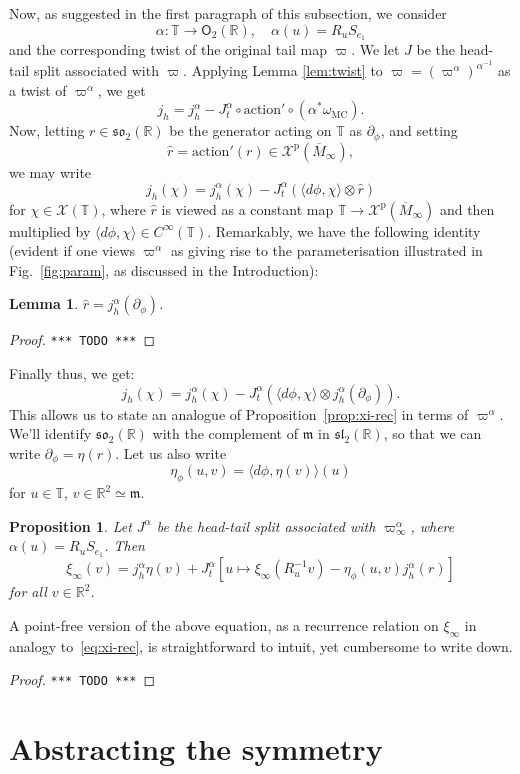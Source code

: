 \documentclass{article}
\def\MISS{\texttt{*** TODO ***}}
\def\fsl{\mathfrak{sl}}
\def\fso{\mathfrak{so}}
\def\fm{\mathfrak{m}}
\def\RR{\mathbb{R}}
\def\TT{\mathbb{T}}
\def\XX{\mathcal{X}}
\def\O{\mathsf{O}}
\def\p{\mathrm{p}}
\newtheorem{lem}{Lemma}
\newtheorem{prop}{Proposition}
\theoremstyle{definition}
\begin{document}
Now, as suggested in the first paragraph of this subsection,
we consider
$$ \alpha : \TT \to \O_2(\RR),\quad \alpha(u) = R_u S_{e_1} $$
and the corresponding twist of the original tail map
$\varpi$. We let $J$ be the head-tail split
associated with $\varpi$. Applying Lemma \ref{lem:twist}
to $\varpi=(\varpi^\alpha)^{\alpha^{-1}}$ as a twist of $\varpi^\alpha$,
we get
$$
 j_h = j^\alpha_h - J^\alpha_t \circ \mathrm{action}' \circ (\alpha^*\omega_{\mathrm{MC}}).
$$
Now, letting $r \in \fso_2(\RR)$ be the generator acting on $\TT$ as $\partial_\phi$,
and setting $$\widehat r = \mathrm{action}'(r) \in \XX^\p(\overline M_\infty),$$
we may write
$$
j_h (\chi) =
j^\alpha_h(\chi) - J^\alpha_t \left( \langle d\phi,\chi\rangle \otimes \widehat r\right)
$$
for $\chi \in \XX(\TT)$, where $\widehat r$
is viewed as a constant map $\TT \to \XX^\p(\overline M_\infty)$ and
then multiplied by $\langle d\phi,\chi\rangle \in C^\infty(\TT)$.
Remarkably, we have the following identity (evident if one 
views $\varpi^\alpha$ as giving rise to the parameterisation
illustrated in
Fig.~\ref{fig:param}, as discussed in the Introduction):
\begin{lem}
        $\widehat r = j^\alpha_h(\partial_\phi)$.
\end{lem}
\begin{proof}
\MISS
\end{proof}
Finally thus, we get:
$$
j_h(\chi) = j^\alpha_h(\chi) - J^\alpha_t(\langle d\phi,\chi\rangle \otimes j^\alpha_h(\partial_\phi)).
$$
This allows us to state an analogue of Proposition~\ref{prop:xi-rec} in terms of $\varpi^\alpha$.
We'll identify $\fso_2(\RR)$ with the complement of $\fm$ in $\fsl_2(\RR)$,
so that we can write $\partial_\phi = \eta(r)$.
Let us also write
$$ \eta_\phi(u,v) = \langle d\phi, \eta(v)\rangle(u) $$
for $u \in \TT$, $v \in \RR^2\simeq\fm$.
\begin{prop}\label{prop:xi-rec-twist}
Let $J^\alpha$ be the head-tail split associated with $\varpi^\alpha_\infty$,
where $\alpha(u) = R_uS_{e_1}$. 
Then 
$$
 \xi_\infty(v) = j^\alpha_h \eta(v) + J^\alpha_t \left[ u\mapsto \xi_\infty(R^{-1}_u v) 
 - \eta_\phi(u,v) j^\alpha_h(r) \right]
$$
for all $v\in\RR^2$.
\end{prop}
A point-free version of the above equation, as a recurrence relation on $\xi_\infty$
in analogy to~\eqref{eq:xi-rec},
is straightforward to intuit, yet cumbersome to write down.
\begin{proof}\MISS\end{proof}

\section{Abstracting the symmetry}
\end{document}
